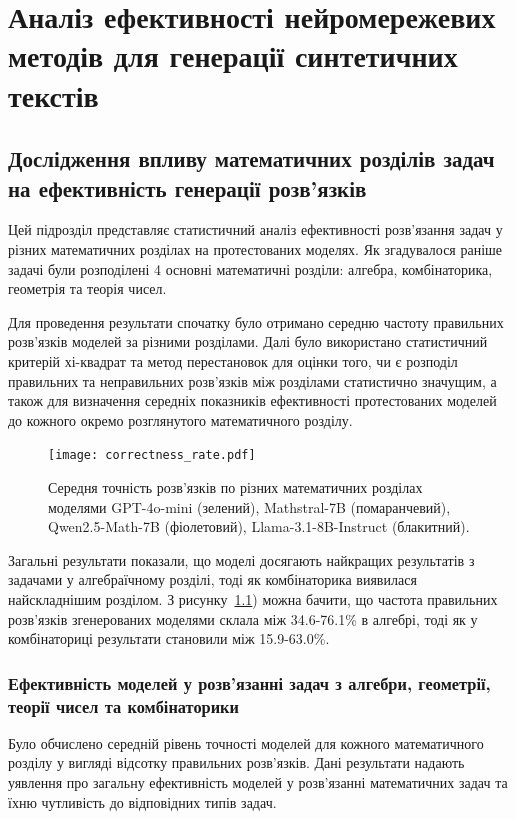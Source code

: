 \chapter{Аналіз ефективності нейромережевих методів для генерації синтетичних текстів}

\section{Дослідження впливу математичних розділів задач на ефективність генерації розв'язків}

Цей підрозділ представляє статистичний аналіз ефективності розв’язання задач у різних математичних розділах на протестованих моделях. Як згадувалося раніше задачі були розподілені 4 основні математичні розділи: алгебра, комбінаторика, геометрія та теорія чисел.

Для проведення результати спочатку було отримано середню частоту правильних розв'язків моделей за різними розділами. Далі було використано статистичний критерій хі-квадрат та метод перестановок для оцінки того, чи є розподіл правильних та неправильних розв'язків між розділами статистично значущим, а також для визначення середніх показників ефективності протестованих моделей до кожного окремо розглянутого математичного розділу.

\begin{figure}[!h]
    \centering
    \texttt{[image: correctness\_rate.pdf]}
    \caption{Середня точність розв'язків по різних математичних розділах моделями GPT-4o-mini (зелений), Mathstral-7B (помаранчевий), Qwen2.5-Math-7B (фіолетовий), Llama-3.1-8B-Instruct (блакитний).}
    \label{fig:correctness_rate}
\end{figure}

Загальні результати показали, що моделі досягають найкращих результатів 
з задачами у алгебраїчному розділі, тоді як комбінаторика виявилася найскладнішим розділом. З рисунку~\ref{fig:correctness_rate}) можна бачити, що частота правильних розв'язків згенерованих моделями склала між 34.6-76.1\% в алгебрі, тоді як у комбінаториці результати становили між 15.9-63.0\%.

\subsection{Ефективність моделей у розв'язанні задач з алгебри, геометрії, теорії чисел та комбінаторики}

Було обчислено середній рівень точності моделей для кожного математичного розділу у вигляді відсотку правильних розв'язків. Дані результати надають уявлення про загальну ефективність моделей у розв'язанні математичних задач та їхню чутливість до відповідних типів задач.

